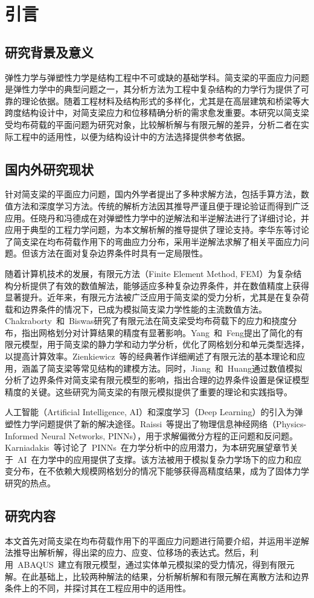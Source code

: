 \chapter{引言}
\label{cha:intro}
\section{研究背景及意义}
弹性力学与弹塑性力学是结构工程中不可或缺的基础学科。简支梁的平面应力问题是弹性力学中的典型问题之一，其分析方法为工程中复杂结构的力学行为提供了可靠的理论依据。随着工程材料及结构形式的多样化，尤其是在高层建筑和桥梁等大跨度结构设计中，对简支梁应力和位移精确分析的需求愈发重要。本研究以简支梁受均布荷载的平面问题为研究对象，比较解析解与有限元解的差异，分析二者在实际工程中的适用性，以便为结构设计中的方法选择提供参考依据。
\section{国内外研究现状}
针对简支梁的平面应力问题，国内外学者提出了多种求解方法，包括手算方法，数值方法和深度学习方法。传统的解析方法因其推导严谨且便于理论验证而得到广泛应用。任晓丹和冯德成\cite{gctsxyl}在对弹塑性力学中的逆解法和半逆解法进行了详细讨论，并应用于典型的工程力学问题，为本文解析解的推导提供了理论支持。李华东等\cite{LXYS201201011}讨论了简支梁在均布荷载作用下的弯曲应力分布，采用半逆解法求解了相关平面应力问题。但该方法在面对复杂边界条件时具有一定局限性。

随着计算机技术的发展，有限元方法（Finite Element Method, FEM）为复杂结构分析提供了有效的数值解法，能够适应多种复杂边界条件，并在数值精度上获得显著提升。近年来，有限元方法被广泛应用于简支梁的受力分析，尤其是在复杂荷载和边界条件的情况下，已成为模拟简支梁力学性能的主流数值方法。Chakraborty~和~Biswas\cite{chakraborty2018finite}研究了有限元法在简支梁受均布荷载下的应力和挠度分布，指出网格划分对计算结果的精度有显著影响。Yang~和~Feng\cite{yang2020static}提出了简化的有限元模型，用于简支梁的静力学和动力学分析，优化了网格划分和单元类型选择，以提高计算效率。Zienkiewicz~等\cite{zienkiewicz2013finite}的经典著作详细阐述了有限元法的基本理论和应用，涵盖了简支梁等常见结构的建模方法。同时，Jiang~和~Huang\cite{jiang2019effect}通过数值模拟分析了边界条件对简支梁有限元模型的影响，指出合理的边界条件设置是保证模型精度的关键。这些研究为简支梁的有限元模拟提供了重要的理论和实践指导。

人工智能（Artificial Intelligence, AI）和深度学习（Deep Learning）的引入为弹塑性力学问题提供了新的解决途径。Raissi~等\cite{raissi2019physics}提出了物理信息神经网络（Physics-Informed Neural Networks, PINNs），用于求解偏微分方程的正问题和反问题。Karniadakis~等\cite{karniadakis2021physics}讨论了~PINNs~在力学分析中的应用潜力，为本研究展望章节关于~AI~在力学中的应用提供了支撑。该方法被用于模拟复杂力学场下的应力和应变分布，在不依赖大规模网格划分的情况下能够获得高精度结果，成为了固体力学研究的热点。
\section{研究内容}
本文首先对简支梁在均布荷载作用下的平面应力问题进行简要介绍，并运用半逆解法推导出解析解，得出梁的应力、应变、位移场的表达式。然后，利用~ABAQUS~建立有限元模型，通过实体单元模拟梁的受力情况，得到有限元解。在此基础上，比较两种解法的结果，分析解析解和有限元解在离散方法和边界条件上的不同，并探讨其在工程应用中的适用性。
